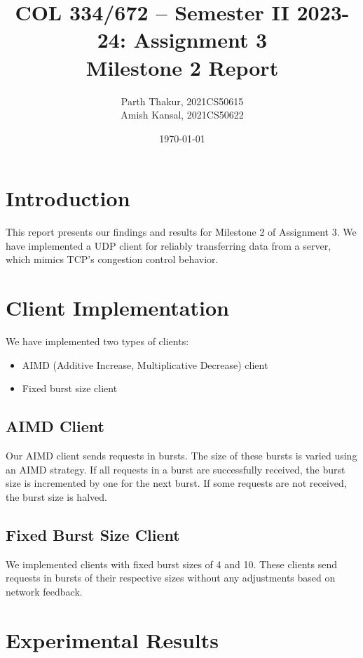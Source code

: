 \documentclass[12pt]{article}
\begin{document}
\title{COL 334/672 – Semester II 2023-24: Assignment 3 \\ Milestone 2 Report}
\author{Parth Thakur, 2021CS50615\\ Amish Kansal, 2021CS50622}
\date{\today}
\maketitle

\section{Introduction}
This report presents our findings and results for Milestone 2 of Assignment 3. We have implemented a UDP client for reliably transferring data from a server, which mimics TCP's congestion control behavior.

\section{Client Implementation}

We have implemented two types of clients:
\begin{itemize}
    \item AIMD (Additive Increase, Multiplicative Decrease) client
    \item Fixed burst size client
\end{itemize}

\subsection{AIMD Client}
Our AIMD client sends requests in bursts. The size of these bursts is varied using an AIMD strategy. If all requests in a burst are successfully received, the burst size is incremented by one for the next burst. If some requests are not received, the burst size is halved.

\subsection{Fixed Burst Size Client}
We implemented clients with fixed burst sizes of 4 and 10. These clients send requests in bursts of their respective sizes without any adjustments based on network feedback.

\clearpage
\section{Experimental Results}
\end{document}
